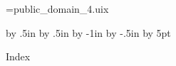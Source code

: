 








\openout\index=public_domain_4.uix








\begingroup
\advance\voffset by .5in
\advance\hoffset by .5in
\advance\hsize by -1in
\advance\vsize by -.5in
\advance\baselineskip by 5pt
\centerline{{\largebx Index}}
\baselineskip

\vfil\eject
\endgroup

\closeout\index

\Copying



\bye



